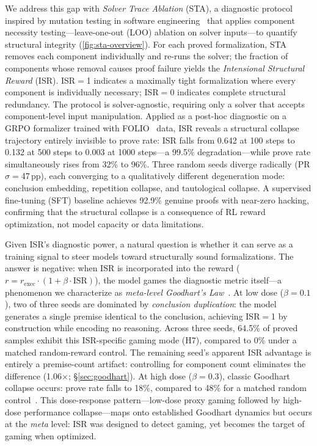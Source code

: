 We address this gap with \emph{Solver Trace Ablation} (STA), a diagnostic protocol inspired by mutation testing in software engineering~\citep{demillo1978} that applies component necessity testing---leave-one-out (LOO) ablation on solver inputs---to quantify structural integrity (\autoref{fig:sta-overview}).
For each proved formalization, STA removes each component individually and re-runs the solver; the fraction of components whose removal causes proof failure yields the \emph{Intensional Structural Reward} (ISR).
ISR${=}$1 indicates a maximally tight formalization where every component is individually necessary; ISR${=}$0 indicates complete structural redundancy.
The protocol is solver-agnostic, requiring only a solver that accepts component-level input manipulation.
Applied as a post-hoc diagnostic on a GRPO formalizer trained with FOLIO~\citep{folio} data, ISR reveals a structural collapse trajectory entirely invisible to prove rate: ISR falls from 0.642 at 100 steps to 0.132 at 500 steps to 0.003 at 1000 steps---a 99.5\% degradation---while prove rate simultaneously rises from 32\% to 96\%.
Three random seeds diverge radically (PR $\sigma{=}$47\,pp), each converging to a qualitatively different degeneration mode: conclusion embedding, repetition collapse, and tautological collapse.
A supervised fine-tuning (SFT) baseline achieves 92.9\% genuine proofs with near-zero hacking, confirming that the structural collapse is a consequence of RL reward optimization, not model capacity or data limitations.

Given ISR's diagnostic power, a natural question is whether it can serve as a training signal to steer models toward structurally sound formalizations.
The answer is negative: when ISR is incorporated into the reward ($r = r_{\text{exec}} \cdot (1 + \beta \cdot \text{ISR})$), the model games the diagnostic metric itself---a phenomenon we characterize as \emph{meta-level Goodhart's Law}~\citep{manheim-goodhart-taxonomy, karwowski-goodhart-rl}.
At low dose ($\beta{=}0.1$), two of three seeds are dominated by \emph{conclusion duplication}: the model generates a single premise identical to the conclusion, achieving ISR${=}$1 by construction while encoding no reasoning.
Across three seeds, 64.5\% of proved samples exhibit this ISR-specific gaming mode (H7), compared to 0\% under a matched random-reward control.
The remaining seed's apparent ISR advantage is entirely a premise-count artifact: controlling for component count eliminates the difference (1.06$\times$; \S\ref{sec:goodhart}).
At high dose ($\beta{=}0.3$), classic Goodhart collapse occurs: prove rate falls to 18\%, compared to 48\% for a matched random control~\citep{gao-reward-overoptimization}.
This dose-response pattern---low-dose proxy gaming followed by high-dose performance collapse---maps onto established Goodhart dynamics but occurs at the \emph{meta} level: ISR was designed to detect gaming, yet becomes the target of gaming when optimized.

